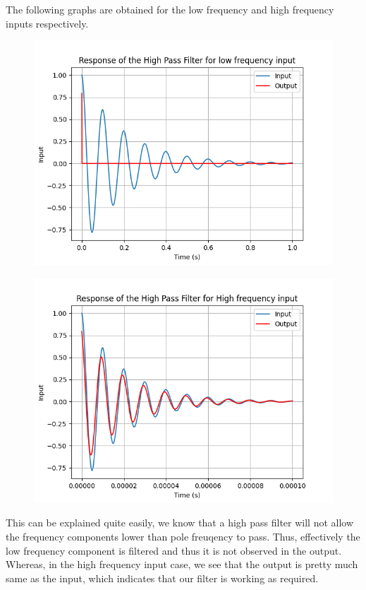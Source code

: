 \documentclass[11pt, a4paper]{article}
\begin{document}
The following graphs are obtained for the low frequency and high frequency inputs respectively.

\begin{figure}[H]
     \centering
     \includegraphics[scale=0.8]{Figure_6.png}
\end{figure}

\begin{figure}[H]
     \centering
     \includegraphics[scale=0.8]{Figure_7.png}
\end{figure}

This can be explained quite easily, we know that a high pass filter will not allow the frequency components lower than pole freuqency to pass. Thus, effectively the low frequency component is filtered and thus it is not observed in the output.\\
Whereas, in the high frequency input case, we see that the output is pretty much same as the input, which indicates that our filter is working as required.
\end{document}
